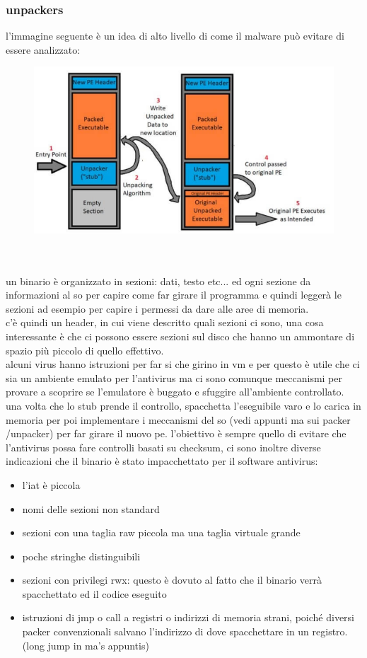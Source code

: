 \documentclass[12pt, oneside]{extbook} %
\begin{document}
\subsubsection{unpackers}
l'immagine seguente è un idea di alto livello di come il malware può evitare di essere analizzato:\\
\begin{figure}[!h]
	\includegraphics[scale=0.3]{immagini/unpacker.png}
\end{figure}\\\\
un binario è organizzato in sezioni: dati, testo etc... ed ogni sezione da informazioni al so per capire come far girare il programma e quindi leggerà le sezioni ad esempio per capire i permessi da dare alle aree di memoria.\\c'è quindi un header, in cui viene descritto quali sezioni ci sono, una cosa interessante è che ci possono essere sezioni sul disco che hanno un ammontare di spazio più piccolo di quello effettivo.\\alcuni virus hanno istruzioni per far si che girino in vm e per questo è utile che ci sia un ambiente emulato per l'antivirus ma ci sono comunque meccanismi per provare a scoprire se l'emulatore è buggato e sfuggire all'ambiente controllato.\\una volta che lo stub prende il controllo, spacchetta l'eseguibile varo e lo carica in memoria per poi implementare i meccanismi del so (vedi appunti ma sui packer /unpacker) per far girare il nuovo pe. l'obiettivo è sempre quello di evitare che l'antivirus possa fare controlli basati su checksum, ci sono inoltre diverse indicazioni che il binario è stato impacchettato per il software antivirus:
\begin{itemize}
\item l'iat è piccola
\item nomi delle sezioni non standard
\item sezioni con una taglia raw piccola ma una taglia virtuale grande
\item poche stringhe distinguibili
\item sezioni con privilegi rwx: questo è dovuto al fatto che il binario verrà spacchettato ed il codice eseguito
\item istruzioni di jmp o call a registri o indirizzi di memoria strani, poiché diversi packer convenzionali salvano l'indirizzo di dove spacchettare in un registro. (long jump in ma's appuntis)
\end{itemize}
\end{document}
